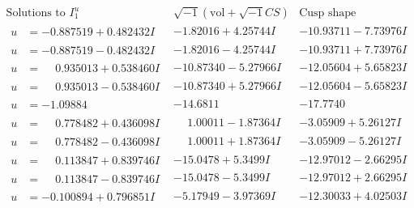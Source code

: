 \documentclass[1p]{elsarticle_modified}
\theoremstyle{definition}
\newcommand{\I}{\sqrt{-1}}
\begin{document}
$$\begin{array}{c|c|c}  
\text{Solutions to }I^u_{1}& \I (\text{vol} + \sqrt{-1}CS) & \text{Cusp shape}\\
 \hline 
\begin{aligned}
u &= -0.887519 + 0.482432 I\end{aligned}
 & -1.82016 + 4.25744 I & -10.93711 - 7.73976 I \\ \hline\begin{aligned}
u &= -0.887519 - 0.482432 I\end{aligned}
 & -1.82016 - 4.25744 I & -10.93711 + 7.73976 I \\ \hline\begin{aligned}
u &= \phantom{-}0.935013 + 0.538460 I\end{aligned}
 & -10.87340 - 5.27966 I & -12.05604 + 5.65823 I \\ \hline\begin{aligned}
u &= \phantom{-}0.935013 - 0.538460 I\end{aligned}
 & -10.87340 + 5.27966 I & -12.05604 - 5.65823 I \\ \hline\begin{aligned}
u &= -1.09884\phantom{ +0.000000I}\end{aligned}
 & -14.6811\phantom{ +0.000000I} & -17.7740\phantom{ +0.000000I} \\ \hline\begin{aligned}
u &= \phantom{-}0.778482 + 0.436098 I\end{aligned}
 & \phantom{-}1.00011 - 1.87364 I & -3.05909 + 5.26127 I \\ \hline\begin{aligned}
u &= \phantom{-}0.778482 - 0.436098 I\end{aligned}
 & \phantom{-}1.00011 + 1.87364 I & -3.05909 - 5.26127 I \\ \hline\begin{aligned}
u &= \phantom{-}0.113847 + 0.839746 I\end{aligned}
 & -15.0478 + 5.3499 I & -12.97012 - 2.66295 I \\ \hline\begin{aligned}
u &= \phantom{-}0.113847 - 0.839746 I\end{aligned}
 & -15.0478 - 5.3499 I & -12.97012 + 2.66295 I \\ \hline\begin{aligned}
u &= -0.100894 + 0.796851 I\end{aligned}
 & -5.17949 - 3.97369 I & -12.30033 + 4.02503 I \\ \hline\begin{aligned}

\end{aligned}
\end{array}$$
\end{document}
